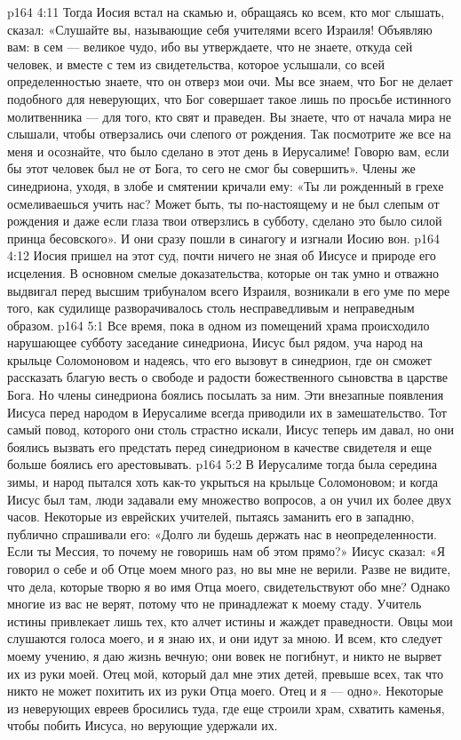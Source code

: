 \vs p164 4:11 Тогда Иосия встал на скамью и, обращаясь ко всем, кто мог слышать, сказал: «Слушайте вы, называющие себя учителями всего Израиля! Объявляю вам: в сем --- великое чудо, ибо вы утверждаете, что не знаете, откуда сей человек, и вместе с тем из свидетельства, которое услышали, со всей определенностью знаете, что он отверз мои очи. Мы все знаем, что Бог не делает подобного для неверующих, что Бог совершает такое лишь по просьбе истинного молитвенника --- для того, кто свят и праведен. Вы знаете, что от начала мира не слышали, чтобы отверзались очи слепого от рождения. Так посмотрите же все на меня и осознайте, что было сделано в этот день в Иерусалиме! Говорю вам, если бы этот человек был не от Бога, то сего не смог бы совершить». Члены же синедриона, уходя, в злобе и смятении кричали ему: «Ты ли рожденный в грехе осмеливаешься учить нас? Может быть, ты по\hyp{}настоящему и не был слепым от рождения и даже если глаза твои отверзлись в субботу, сделано это было силой принца бесовского». И они сразу пошли в синагогу и изгнали Иосию вон.
\vs p164 4:12 Иосия пришел на этот суд, почти ничего не зная об Иисусе и природе его исцеления. В основном смелые доказательства, которые он так умно и отважно выдвигал перед высшим трибуналом всего Израиля, возникали в его уме по мере того, как судилище разворачивалось столь несправедливым и неправедным образом.
\vs p164 5:1 Все время, пока в одном из помещений храма происходило нарушающее субботу заседание синедриона, Иисус был рядом, уча народ на крыльце Соломоновом и надеясь, что его вызовут в синедрион, где он сможет рассказать благую весть о свободе и радости божественного сыновства в царстве Бога. Но члены синедриона боялись посылать за ним. Эти внезапные появления Иисуса перед народом в Иерусалиме всегда приводили их в замешательство. Тот самый повод, которого они столь страстно искали, Иисус теперь им давал, но они боялись вызвать его предстать перед синедрионом в качестве свидетеля и еще больше боялись его арестовывать.
\vs p164 5:2 В Иерусалиме тогда была середина зимы, и народ пытался хоть как\hyp{}то укрыться на крыльце Соломоновом; и когда Иисус был там, люди задавали ему множество вопросов, а он учил их более двух часов. Некоторые из еврейских учителей, пытаясь заманить его в западню, публично спрашивали его: «Долго ли будешь держать нас в неопределенности. Если ты Мессия, то почему не говоришь нам об этом прямо?» Иисус сказал: «Я говорил о себе и об Отце моем много раз, но вы мне не верили. Разве не видите, что дела, которые творю я во имя Отца моего, свидетельствуют обо мне? Однако многие из вас не верят, потому что не принадлежат к моему стаду. Учитель истины привлекает лишь тех, кто алчет истины и жаждет праведности. Овцы мои слушаются голоса моего, и я знаю их, и они идут за мною. И всем, кто следует моему учению, я даю жизнь вечную; они вовек не погибнут, и никто не вырвет их из руки моей. Отец мой, который дал мне этих детей, превыше всех, так что никто не может похитить их из руки Отца моего. Отец и я --- одно». Некоторые из неверующих евреев бросились туда, где еще строили храм, схватить каменья, чтобы побить Иисуса, но верующие удержали их.
